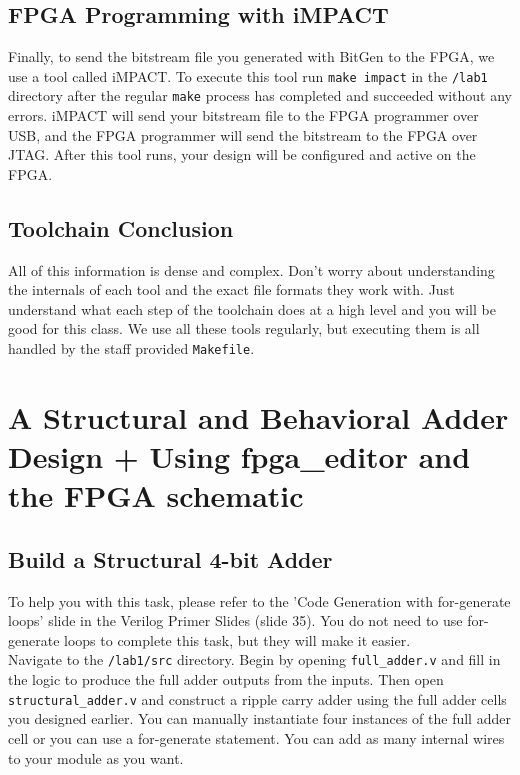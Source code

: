 \documentclass[11pt]{article}
\begin{document}
\subsection{FPGA Programming with iMPACT}
Finally, to send the bitstream file you generated with BitGen to the FPGA, we use a tool called iMPACT. To execute this tool run \verb|make impact| in the \verb|/lab1| directory after the regular \verb|make| process has completed and succeeded without any errors. iMPACT will send your bitstream file to the FPGA programmer over USB, and the FPGA programmer will send the bitstream to the FPGA over JTAG. After this tool runs, your design will be configured and active on the FPGA.

\subsection{Toolchain Conclusion}
All of this information is dense and complex. Don't worry about understanding the internals of each tool and the exact file formats they work with. Just understand what each step of the toolchain does at a high level and you will be good for this class. We use all these tools regularly, but executing them is all handled by the staff provided \verb|Makefile|.


\section{A Structural and Behavioral Adder Design + Using fpga\_editor and the FPGA schematic}

\subsection{Build a Structural 4-bit Adder}
To help you with this task, please refer to the 'Code Generation with for-generate loops' slide in the Verilog Primer Slides (slide 35). You do not need to use for-generate loops to complete this task, but they will make it easier.\\

Navigate to the \verb|/lab1/src| directory. Begin by opening \verb|full_adder.v| and fill in the logic to produce the full adder outputs from the inputs. Then open \verb|structural_adder.v| and construct a ripple carry adder using the full adder cells you designed earlier. You can manually instantiate four instances of the full adder cell or you can use a for-generate statement. You can add as many internal wires to your module as you want.
\end{document}
